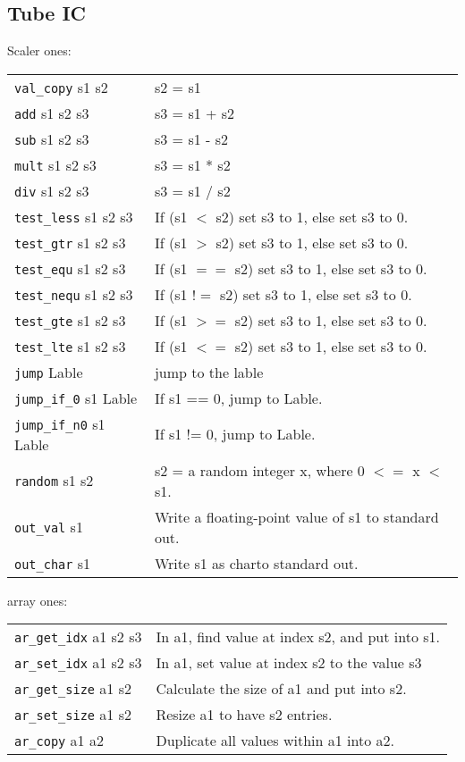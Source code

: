 \documentclass[10pt,landscape]{article}
\begin{document}
\begin{multicols}{3}
        \section{Tube IC}
        Scaler ones:
        \begin{tabular}{p{} p{}}
        \verb!val_copy! s1 s2       & s2 = s1 \\
        \verb!add! s1 s2  s3        & s3 = s1 + s2\\
        \verb!sub! s1 s2  s3        & s3 = s1 - s2 \\
        \verb!mult! s1 s2  s3       & s3 = s1 * s2 \\
        \verb!div! s1 s2  s3        & s3 = s1 / s2 \\
        \verb!test_less! s1 s2  s3  & If (s1 $<$ s2) set s3 to 1, else set s3 to 0. \\
        \verb!test_gtr! s1 s2  s3   & If (s1 $>$ s2) set s3 to 1, else set s3 to 0. \\
        \verb!test_equ! s1 s2  s3   & If (s1 $==$ s2) set s3 to 1, else set s3 to 0. \\
        \verb!test_nequ! s1 s2  s3  & If (s1 $!=$ s2) set s3 to 1, else set s3 to 0. \\
        \verb!test_gte! s1 s2  s3   & If (s1 $>=$ s2) set s3 to 1, else set s3 to 0. \\
        \verb!test_lte! s1 s2  s3   & If (s1 $<=$ s2) set s3 to 1, else set s3 to 0. \\
        \verb!jump! Lable       & jump to the lable \\
        \verb!jump_if_0! s1 Lable      & If s1 == 0, jump to Lable. \\
        \verb!jump_if_n0! s1 Lable       & If s1 != 0, jump to Lable. \\
        \verb!random! s1 s2       & s2 = a random integer x, where 0 $<=$ x $<$ s1. \\
        \verb!out_val! s1       & Write a floating-point value of s1 to standard out. \\
        \verb!out_char! s1      & Write s1 as charto standard out. \\
        \end{tabular}
        array ones:
        \begin{tabular}{p{} p{}}
        \verb!ar_get_idx! a1 s2 s3       & In a1, find value at index s2, and put into s1. \\
        \verb!ar_set_idx! a1 s2 s3        & In a1, set value at index s2 to the value s3\\
        \verb!ar_get_size! a1 s2        & Calculate the size of a1 and put into s2. \\
        \verb!ar_set_size! a1 s2       & Resize a1 to have s2 entries. \\
        \verb!ar_copy! a1 a2       & Duplicate all values within a1 into a2.\\
        \end{tabular}


\end{multicols}
\end{document}
